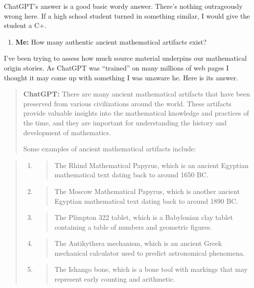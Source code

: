ChatGPT's answer is a good basic wordy answer. There's nothing
outrageously wrong here. If a high school student turned in
something similar, I would give the student a C+.

\begin{enumerate}
\def\labelenumi{\arabic{enumi}.}
\setcounter{enumi}{1}
\item
  \textbf{Me:} How many authentic ancient mathematical artifacts exist?
\end{enumerate}

I've been trying to assess how much source material underpins our
mathematical origin stories. As ChatGPT was ``trained'' on many millions
of web pages I thought it may come up with something I was unaware he.
Here is its answer.

\begin{quote}
\textbf{ChatGPT:} There are many ancient mathematical artifacts that
have been preserved from various civilizations around the world. These
artifacts provide valuable insights into the mathematical knowledge and
practices of the time, and they are important for understanding the
history and development of mathematics.

Some examples of ancient mathematical artifacts include:
\end{quote}

\begin{quote}
\begin{enumerate}
\item
  \begin{quote}
  The Rhind Mathematical Papyrus, which is an ancient Egyptian
  mathematical text dating back to around 1650 BC.
  \end{quote}
\item
  \begin{quote}
  The Moscow Mathematical Papyrus, which is another ancient Egyptian
  mathematical text dating back to around 1890 BC.
  \end{quote}
\item
  \begin{quote}
  The Plimpton 322 tablet, which is a Babylonian clay tablet containing
  a table of numbers and geometric figures.
  \end{quote}
\item
  \begin{quote}
  The Antikythera mechanism, which is an ancient Greek mechanical
  calculator used to predict astronomical phenomena.
  \end{quote}
\item
  \begin{quote}
  The Ishango bone, which is a bone tool with markings that may
  represent early counting and arithmetic.
  \end{quote}
\end{enumerate}
\end{quote}

